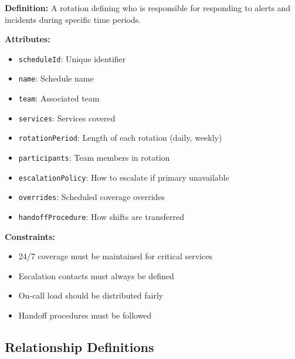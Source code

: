 \documentclass[11pt,letterpaper]{article}
\begin{document}
\begin{definitionbox}
\textbf{Definition:} A rotation defining who is responsible for responding to alerts and incidents during specific time periods.

\textbf{Attributes:}
\begin{itemize}[nosep]
    \item \texttt{scheduleId}: Unique identifier
    \item \texttt{name}: Schedule name
    \item \texttt{team}: Associated team
    \item \texttt{services}: Services covered
    \item \texttt{rotationPeriod}: Length of each rotation (daily, weekly)
    \item \texttt{participants}: Team members in rotation
    \item \texttt{escalationPolicy}: How to escalate if primary unavailable
    \item \texttt{overrides}: Scheduled coverage overrides
    \item \texttt{handoffProcedure}: How shifts are transferred
\end{itemize}

\textbf{Constraints:}
\begin{itemize}[nosep]
    \item 24/7 coverage must be maintained for critical services
    \item Escalation contacts must always be defined
    \item On-call load should be distributed fairly
    \item Handoff procedures must be followed
\end{itemize}
\end{definitionbox}

\subsection{Relationship Definitions}
\end{document}
